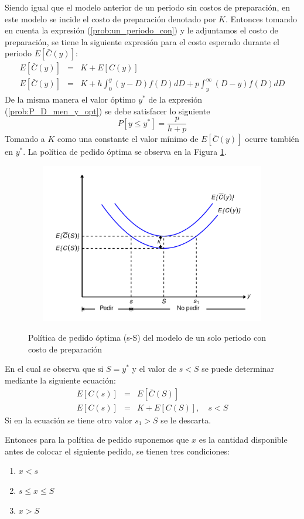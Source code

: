 Siendo igual que el modelo anterior de un periodo sin costos de preparación, en este modelo se incide el costo de preparación denotado por $K$. Entonces tomando en cuenta la expresión (\ref{prob:un_periodo_con}) y le adjuntamos el costo de preparación, se tiene la siguiente expresión para el costo esperado durante el periodo $E[\bar{C}(y)]$:
\begin{eqnarray}
	E[\bar{C}(y)] &=& K + E[C(y)] \nonumber \\
	E[\bar{C}(y)] &=& K + h \int_{0}^{y} (y-D)f(D)dD + p \int_{y}^{\infty} (D-y)f(D)dD
\end{eqnarray}
De la misma manera el valor óptimo $y^*$ de la expresión (\ref{prob:P_D_men_y_opt}) se debe satisfacer lo siguiente
\begin{equation}
	P[y \leq y^*] = \frac{p}{h+p}
\end{equation}
Tomando a $K$ como una constante el valor mínimo de $E[\bar{C}(y)]$ ocurre también en $y^*$. La política de pedido óptima se observa en la Figura \ref{fig:img14}.
\newpage
\begin{figure}[H]
  \caption{Política de pedido óptima (s-S) del modelo de un solo periodo con costo de preparación}
  {\includegraphics[width=13.5cm, height=7cm]{images/img14.pdf}}
  \label{fig:img14}
\end{figure}
En el cual se observa que si $S = y^*$ y el valor de $s < S$ se puede determinar mediante la siguiente ecuación:
\begin{eqnarray}
	E[C(s)] &=& E[\bar{C}(S)] \nonumber \\
	E[C(s)] &=& K + E[C(S)], \quad s < S
\end{eqnarray}
Si en la ecuación se tiene otro valor ${s}_{1} > S$ se le descarta. 

Entonces para la política de pedido suponemos que $x$ es la cantidad disponible antes de colocar el siguiente pedido, se tienen tres condiciones:
\begin{enumerate}
	\item $x < s$
	\item $s \leq x \leq S$
	\item $x > S$ 
\end{enumerate}

